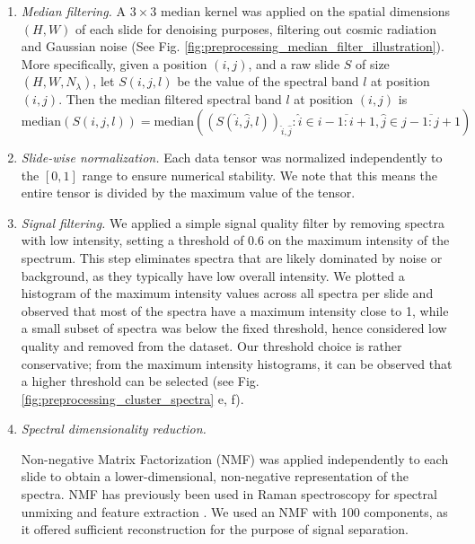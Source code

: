 \begin{enumerate}
    \item \emph{Median filtering.} A $3 \times 3$ median kernel was applied on the spatial dimensions $(H,W)$ of each slide for denoising purposes, filtering out cosmic radiation and Gaussian noise (See Fig. \ref{fig:preprocessing_median_filter_illustration}). More specifically, given a position $(i,j)$, and a raw slide $S$ of size $(H,W,N_\lambda)$, let $S(i,j,l)$ be the value of the spectral band $l$ at position $(i,j)$. Then the median filtered spectral band $l$ at position $(i,j)$ is 
    $$ \text{median}(S(i,j,l)) = \text{median} \left( \left( S(\hat{i}, \hat{j}, l) \right)_{\hat{i}, \hat{j}} : \hat{i} \in \overline{i-1:i+1}, \hat{j} \in \overline{j-1:j+1} \right) $$

    \item \emph{Slide-wise normalization.} Each data tensor was normalized independently to the $[0,1]$ range to ensure numerical stability. We note that this means the entire tensor is divided by the maximum value of the tensor.

    \item \emph{Signal filtering.} We applied a simple signal quality filter by removing spectra with low intensity, setting a threshold of 0.6 on the maximum intensity of the spectrum. This step eliminates spectra that are likely dominated by noise or background, as they typically have low overall intensity. We plotted a histogram of the maximum intensity values across all spectra per slide and observed that most of the spectra have a maximum intensity close to 1, while a small subset of spectra was below the fixed threshold, hence considered low quality and removed from the dataset. Our threshold choice is rather conservative; from the maximum intensity histograms, it can be observed that a higher threshold can be selected (see Fig. \ref{fig:preprocessing_cluster_spectra} e, f).

    \item \emph{Spectral dimensionality reduction.} 

    Non-negative Matrix Factorization (NMF) \cite{NMF1999} was applied independently to each slide to obtain a lower-dimensional, non-negative representation of the spectra. NMF has previously been used in Raman spectroscopy for spectral unmixing and feature extraction \cite{NMF1999,nmf_oncology_2022, Alix2022}. We used an NMF with 100 components, as it offered sufficient reconstruction for the purpose of signal separation. 
    

\end{enumerate}
